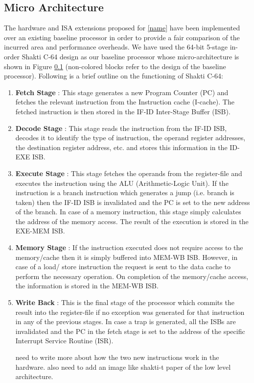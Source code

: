 \subsection{Micro Architecture}
The hardware and ISA extensions proposed for \ref{name} have been implemented over an existing baseline processor in order to provide a fair comparison of the incurred area and performance overheads.  We have used the 64-bit 5-stage in-order Shakti C-64 design \cite{Shakti} as our baseline processor whose micro-architecture is shown in Figure \ref{} (non-colored blocks refer to the design of the baseline processor). Following  is  a  brief  outline  on  the  functioning  of Shakti C-64:

\begin{enumerate}
    \item \textbf{Fetch Stage} : This  stage  generates  a  new  Program Counter (PC) and fetches the relevant instruction from the Instruction cache (I-cache).  The fetched instruction is then stored in the IF-ID Inter-Stage Buffer (ISB).
    
    \item \textbf{Decode Stage} : This stage reads the instruction from the IF-ID ISB, decodes it to identify the type of instruction, the operand register addresses, the destination register address, etc.  and stores this information in the ID-EXE ISB.
    
    \item \textbf{Execute Stage} : This stage fetches the operands from the register-file and executes the instruction using the ALU (Arithmetic-Logic Unit).  If the instruction is a branch instruction which generates a jump (i.e.  branch is taken) then the IF-ID ISB is invalidated and the PC is set to the new address of the branch.  In case of a memory instruction, this stage  simply  calculates  the  address  of  the  memory  access. The result of the execution is stored in the EXE-MEM ISB.
    
    \item \textbf{Memory Stage} : If the instruction executed does not require access to the memory/cache then it is simply buffered into  MEM-WB  ISB.  However,  in  case  of  a  load/  store instruction the request is sent to the data cache to perform the  necessary  operation.   On  completion  of  the  memory/cache access, the information is stored in the MEM-WB ISB.
    
    \item \textbf{Write Back} : This is the final stage of the processor  which  commits  the  result  into  the  register-file  if  no exception was generated for that instruction in any of the previous  stages.   In  case  a  trap  is  generated,  all  the  ISBs are invalidated and the PC in the fetch stage is set to the address of the specific Interrupt Service Routine (ISR).
    
    need to write more about how the two new instructions work in the hardware. also need to add an image like shakti-t paper of the low level architecture.
\end{enumerate}

